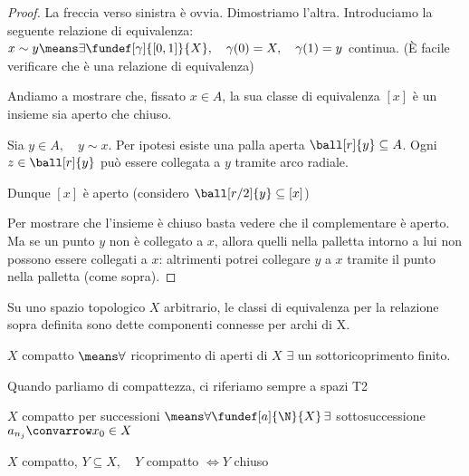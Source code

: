 \begin{proof}
 La freccia verso sinistra è ovvia. Dimostriamo l'altra.
 Introduciamo la seguente relazione di equivalenza:
 $x\sim y \means \exists \fundef[\gamma]{[0,1]}{X},\quad \gamma(0)=X,\quad \gamma(1)=y$ continua. 
 (È facile verificare che è una relazione di equivalenza)
 
 Andiamo a mostrare che, fissato $x\in A$, la sua classe di equivalenza $\left [x\right ]$ è un insieme sia aperto che chiuso.
 
 Sia $y\in A,\quad y\sim x$. Per ipotesi esiste una palla aperta $\ball[r]{y}\subseteq A$. Ogni $z\in \ball[r]{y}$ può essere collegata a $y$ tramite arco radiale.
 
 Dunque $\left[x\right]$ è aperto (considero $\ball[r/2]{y}\subseteq [x]$)
 
 Per mostrare che l'insieme è chiuso basta vedere che il complementare è aperto. Ma se un punto $y$ non è collegato a $x$, allora quelli nella palletta intorno a lui non possono essere collegati a $x$:
 altrimenti potrei collegare $y$ a $x$ tramite il punto nella palletta (come sopra).
\end{proof}
\begin{defn}
 Su uno spazio topologico $X$ arbitrario, le classi di equivalenza per la relazione sopra definita sono dette componenti connesse per archi di X.
\end{defn}
\begin{defn}
 $X$ compatto $\means \forall$ ricoprimento di aperti di $X$ $\exists$ un sottoricoprimento finito.
\end{defn}
\begin{oss}
 Quando parliamo di compattezza, ci riferiamo sempre a spazi T2
\end{oss}
\begin{defn}
 $X$ compatto per successioni $\means \forall \fundef[a]{\N}{X} \, \exists$ sottosuccessione $a_{n_j}\convarrow x_0\in X$
\end{defn}
\begin{prop}
 $X$ compatto, $Y\subseteq X,\quad Y$ compatto $\iff Y$ chiuso
\end{prop}

